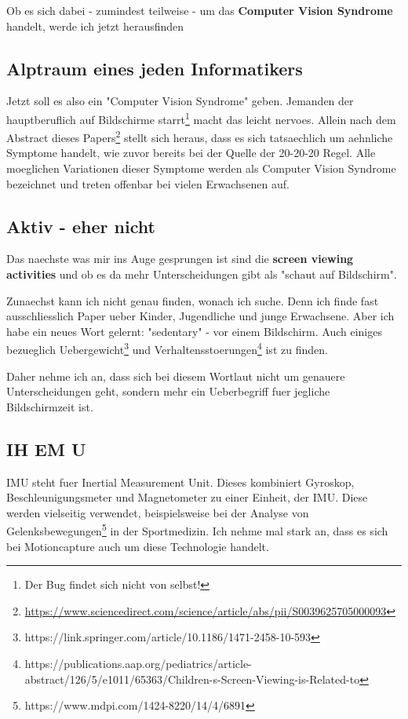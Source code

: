 Ob es sich dabei - zumindest teilweise - 
um das \textbf{Computer Vision Syndrome} handelt, werde ich jetzt herausfinden

\subsection{Alptraum eines jeden Informatikers}

Jetzt soll es also ein "Computer Vision Syndrome" geben. Jemanden der hauptberuflich auf Bildschirme starrt\footnote{Der Bug findet sich nicht von selbst!}
macht das leicht nervoes. Allein nach dem Abstract dieses Papers\footnote{\url{https://www.sciencedirect.com/science/article/abs/pii/S0039625705000093}}
stellt sich heraus, dass es sich tatsaechlich um aehnliche Symptome handelt, wie zuvor bereits bei der Quelle der 20-20-20 Regel. 
Alle moeglichen Variationen dieser Symptome werden als Computer Vision Syndrome bezeichnet und treten offenbar bei vielen Erwachsenen auf.

\subsection{Aktiv - eher nicht}

Das naechste was mir ins Auge gesprungen ist sind die \textbf{screen viewing activities} und ob es da mehr Unterscheidungen gibt als "schaut auf Bildschirm".

Zunaechst kann ich nicht genau finden, wonach ich suche. Denn ich finde fast ausschliesslich Paper ueber Kinder, Jugendliche und junge Erwachsene.
Aber ich habe ein neues Wort gelernt: "sedentary" - vor einem Bildschirm. Auch einiges bezueglich 
Uebergewicht\footnote{https://link.springer.com/article/10.1186/1471-2458-10-593}
und Verhaltensstoerungen\footnote{https://publications.aap.org/pediatrics/article-abstract/126/5/e1011/65363/Children-s-Screen-Viewing-is-Related-to}
ist zu finden.

Daher nehme ich an, dass sich bei diesem Wortlaut nicht um genauere Unterscheidungen geht, sondern mehr ein Ueberbegriff fuer jegliche Bildschirmzeit ist.

\subsection{IH EM U}

IMU steht fuer Inertial Measurement Unit. Dieses kombiniert Gyroskop, Beschleunigungsmeter und Magnetometer zu einer Einheit, der IMU.
Diese werden vielseitig verwendet, beispielsweise bei der Analyse von Gelenksbewegungen\footnote{https://www.mdpi.com/1424-8220/14/4/6891}
in der Sportmedizin. Ich nehme mal stark an, dass es sich bei Motioncapture auch um diese Technologie handelt.

